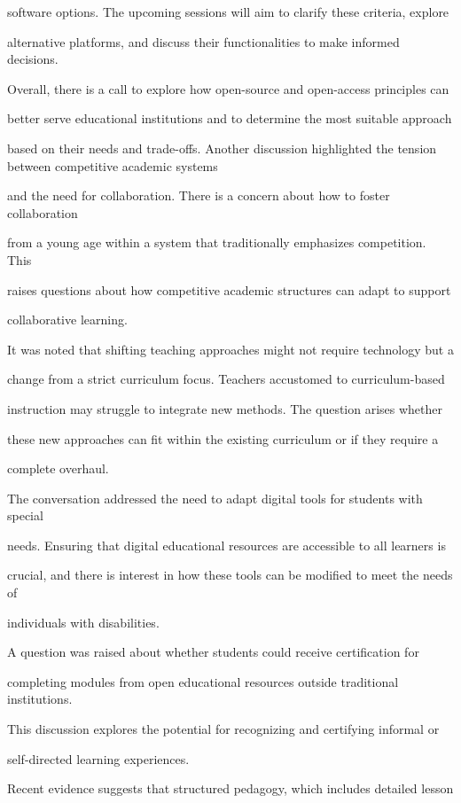 \documentclass[11pt]{article}
\begin{document}
software options. The upcoming sessions will aim to clarify these criteria, explore

alternative platforms, and discuss their functionalities to make informed decisions.

Overall, there is a call to explore how open-source and open-access principles can

better serve educational institutions and to determine the most suitable approach

based on their needs and trade-offs. Another discussion highlighted the tension between competitive academic systems

and the need for collaboration. There is a concern about how to foster collaboration

from a young age within a system that traditionally emphasizes competition. This

raises questions about how competitive academic structures can adapt to support

collaborative learning.

It was noted that shifting teaching approaches might not require technology but a

change from a strict curriculum focus. Teachers accustomed to curriculum-based

instruction may struggle to integrate new methods. The question arises whether

these new approaches can fit within the existing curriculum or if they require a

complete overhaul.

The conversation addressed the need to adapt digital tools for students with special

needs. Ensuring that digital educational resources are accessible to all learners is

crucial, and there is interest in how these tools can be modified to meet the needs of

individuals with disabilities.

A question was raised about whether students could receive certification for

completing modules from open educational resources outside traditional institutions.

This discussion explores the potential for recognizing and certifying informal or

self-directed learning experiences.

Recent evidence suggests that structured pedagogy, which includes detailed lesson
\end{document}
